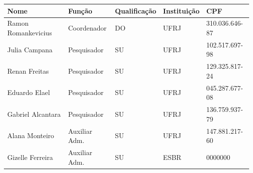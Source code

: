 \begin{onecolumn}
\thispagestyle{empty}


\begin{center}

  
 \vfill



  
  \vspace{0.50cm}



  \begin{center}
    \begin{tabular}{| l | l | l | l | l |}
    
    \hline
   	 Nome 					& Função			 & Qualificação 	& Instituição	 & CPF \\ \hline
   	 Ramon Romankevicius 		& Coordenador 	& DO			 & UFRJ 		& 310.036.646-87\\			\hline
   	Julia Campana 			& Pesquisador		 & SU 			& UFRJ 	& 102.517.697-98\\ 			\hline
   	Renan Freitas 				& Pesquisador 		& SU 			& UFRJ 	& 129.325.817-24\\ 		
   	\hline Eduardo Elael 				& Pesquisador 		& SU 			& UFRJ	 & 045.287.677-08\\ 			\hline
  	Gabriel Alcantara 			& Pesquisador 		& SU 			& UFRJ 	& 136.759.937-79\\
  	\hline
   	Alana Monteiro 			 & Auxiliar Adm.	 & SU 			& UFRJ 	& 147.881.217-60\\ 		
\hline
	Gizelle Ferreira 			& Auxiliar Adm. 	& SU 			& ESBR 	& 0000000\\ 
\hline

    
    \hline 
    \end{tabular}
\end{center}

\end{center}
\end{onecolumn}

\newpage

\hypersetup{pageanchor=true}

